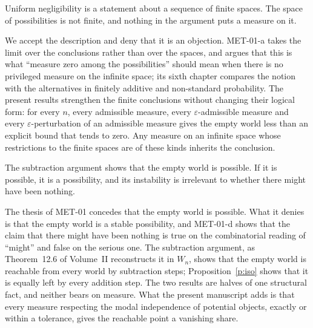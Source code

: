\documentclass{situationist-preprint}
\begin{document}
\begin{objection}
Uniform negligibility is a statement about a sequence of finite spaces. The space of possibilities is not finite, and nothing in the argument puts a measure on it.
\end{objection}

\begin{reply}
We accept the description and deny that it is an objection. MET-01-a takes the limit over the conclusions rather than over the spaces, and argues that this is what \enquote{measure zero among the possibilities} should mean when there is no privileged measure on the infinite space; its sixth chapter compares the notion with the alternatives in finitely additive and non-standard probability. The present results strengthen the finite conclusions without changing their logical form: for every $n$, every admissible measure, every $\varepsilon$-admissible measure and every $\varepsilon$-perturbation of an admissible measure gives the empty world less than an explicit bound that tends to zero. Any measure on an infinite space whose restrictions to the finite spaces are of these kinds inherits the conclusion.
\end{reply}

\begin{objection}
The subtraction argument shows that the empty world is possible. If it is possible, it is a possibility, and its instability is irrelevant to whether there might have been nothing.
\end{objection}

\begin{reply}
The thesis of MET-01 concedes that the empty world is possible. What it denies is that the empty world is a stable possibility, and MET-01-d shows that the claim that there might have been nothing is true on the combinatorial reading of \enquote{might} and false on the serious one. The subtraction argument, as Theorem~12.6 of Volume~II reconstructs it in $W_n$, shows that the empty world is reachable from every world by subtraction steps; Proposition~\ref{p:iso} shows that it is equally left by every addition step. The two results are halves of one structural fact, and neither bears on measure. What the present manuscript adds is that every measure respecting the modal independence of potential objects, exactly or within a tolerance, gives the reachable point a vanishing share.
\end{reply}
\end{document}
